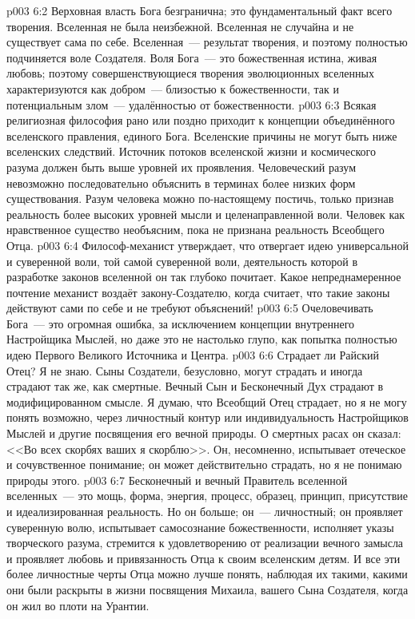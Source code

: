\vs p003 6:2 Верховная власть Бога безгранична; это фундаментальный факт всего творения. Вселенная не была неизбежной. Вселенная не случайна и не существует сама по себе. Вселенная~--- результат творения, и поэтому полностью подчиняется воле Создателя. Воля Бога~--- это божественная истина, живая любовь; поэтому совершенствующиеся творения эволюционных вселенных характеризуются как добром~--- близостью к божественности, так и потенциальным злом~--- удалённостью от божественности.
\vs p003 6:3 \pc Всякая религиозная философия рано или поздно приходит к концепции объединённого вселенского правления, единого Бога. Вселенские причины не могут быть ниже вселенских следствий. Источник потоков вселенской жизни и космического разума должен быть выше уровней их проявления. Человеческий разум невозможно последовательно объяснить в терминах более низких форм существования. Разум человека можно по\hyp{}настоящему постичь, только признав реальность более высоких уровней мысли и целенаправленной воли. Человек как нравственное существо необъясним, пока не признана реальность Всеобщего Отца.
\vs p003 6:4 Философ\hyp{}механист утверждает, что отвергает идею универсальной и суверенной воли, той самой суверенной воли, деятельность которой в разработке законов вселенной он так глубоко почитает. Какое непреднамеренное почтение механист воздаёт закону\hyp{}Создателю, когда считает, что такие законы действуют сами по себе и не требуют объяснений!
\vs p003 6:5 Очеловечивать Бога~--- это огромная ошибка, за исключением концепции внутреннего Настройщика Мыслей, но даже это не настолько глупо, как попытка полностью  идею Первого Великого Источника и Центра.
\vs p003 6:6 \pc Страдает ли Райский Отец? Я не знаю. Сыны Создатели, безусловно, могут страдать и иногда страдают так же, как смертные. Вечный Сын и Бесконечный Дух страдают в модифицированном смысле. Я думаю, что Всеобщий Отец страдает, но я не могу понять  возможно, через личностный контур или индивидуальность Настройщиков Мыслей и другие посвящения его вечной природы. О смертных расах он сказал: <<Во всех скорбях ваших я скорблю>>. Он, несомненно, испытывает отеческое и сочувственное понимание; он может действительно страдать, но я не понимаю природы этого.
\vs p003 6:7 \pc Бесконечный и вечный Правитель вселенной вселенных~--- это мощь, форма, энергия, процесс, образец, принцип, присутствие и идеализированная реальность. Но он больше; он~--- личностный; он проявляет суверенную волю, испытывает самосознание божественности, исполняет указы творческого разума, стремится к удовлетворению от реализации вечного замысла и проявляет любовь и привязанность Отца к своим вселенским детям. И все эти более личностные черты Отца можно лучше понять, наблюдая их такими, какими они были раскрыты в жизни посвящения Михаила, вашего Сына Создателя, когда он жил во плоти на Урантии.

